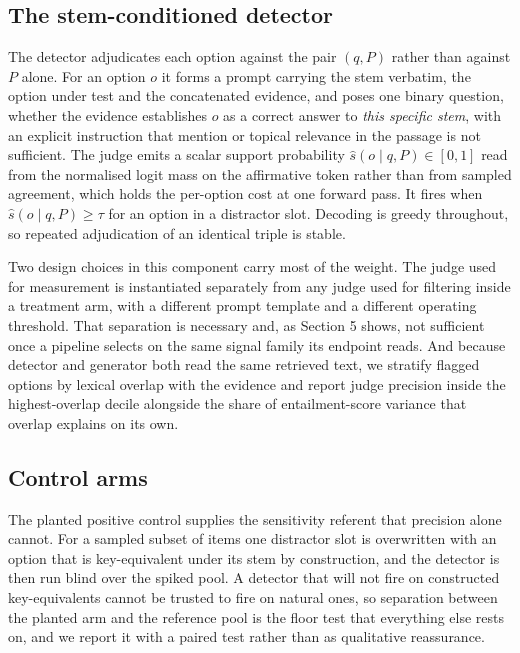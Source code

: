 \documentclass[11pt]{article}
\begin{document}
\subsection{The stem-conditioned detector}

The detector adjudicates each option against the pair $(q, P)$ rather than against $P$ alone. For an option $o$ it forms a prompt carrying the stem verbatim, the option under test and the concatenated evidence, and poses one binary question, whether the evidence establishes $o$ as a correct answer to \emph{this specific stem}, with an explicit instruction that mention or topical relevance in the passage is not sufficient. The judge emits a scalar support probability $\hat{s}(o \mid q, P) \in [0,1]$ read from the normalised logit mass on the affirmative token rather than from sampled agreement, which holds the per-option cost at one forward pass. It fires when $\hat{s}(o \mid q, P) \geq \tau$ for an option in a distractor slot. Decoding is greedy throughout, so repeated adjudication of an identical triple is stable.

Two design choices in this component carry most of the weight. The judge used for measurement is instantiated separately from any judge used for filtering inside a treatment arm, with a different prompt template and a different operating threshold. That separation is necessary and, as Section 5 shows, not sufficient once a pipeline selects on the same signal family its endpoint reads. And because detector and generator both read the same retrieved text, we stratify flagged options by lexical overlap with the evidence and report judge precision inside the highest-overlap decile alongside the share of entailment-score variance that overlap explains on its own.

\subsection{Control arms}

The planted positive control supplies the sensitivity referent that precision alone cannot. For a sampled subset of items one distractor slot is overwritten with an option that is key-equivalent under its stem by construction, and the detector is then run blind over the spiked pool. A detector that will not fire on constructed key-equivalents cannot be trusted to fire on natural ones, so separation between the planted arm and the reference pool is the floor test that everything else rests on, and we report it with a paired test rather than as qualitative reassurance.
\end{document}
